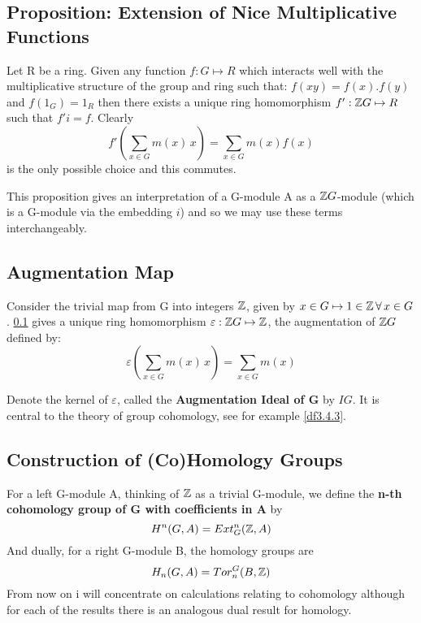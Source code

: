 \subsection{Proposition: Extension of Nice Multiplicative
Functions}\label{df3.1.2} Let R be a ring. Given any function
$f:G\mapsto R$ which interacts well with the multiplicative
structure of the group and ring such that: $f(xy)=f(x).f(y)$ and
$f(1_G) = 1_R$ then there exists a unique ring homomorphism $f':\mathbb Z
G\mapsto R$ such that $f'i = f$. Clearly
$$f'(\sum_{x\in G} m(x)\, x) = \sum_{x\in G} m(x) f(x)$$ is the
only possible choice and this commutes.

This proposition gives an interpretation of a G-module A as a $\mathbb Z
G$-module (which is a G-module via the embedding $i$) and so we
may use these terms interchangeably.

\subsection{Augmentation Map}\label{df3.1.1}
Consider the trivial map from G into integers $\mathbb Z$, given by $x\in
G \mapsto 1\in\mathbb Z\,\forall\, x\in G$. \ref{df3.1.2} gives a unique
ring homomorphism $\varepsilon: \mathbb Z G \mapsto \mathbb Z$, the augmentation
of $\mathbb Z G$ defined by:
$$\varepsilon \left ( \sum_{x\in G} m(x)\, x \right ) = \sum_{x\in G}
m(x)$$

Denote the kernel of $\varepsilon$, called the
\textbf{Augmentation Ideal of G} by $IG$. It is central to the
theory of group cohomology, see for example \ref{df3.4.3}.


\subsection{Construction of (Co)Homology Groups}\label{df3.2}

For a left G-module A, thinking of $\mathbb Z$ as a trivial G-module, we
define the \textbf{n-th cohomology group of G with coefficients in
A} by
$$H^n(G,A) = Ext^n_G (\mathbb Z,A)$$
And dually, for a right G-module B, the homology groups are
$$H_n(G,A) = Tor^G_n (B,\mathbb Z)$$
From now on i will concentrate on calculations relating to
cohomology although for each of the results there is an analogous
dual result for homology.

